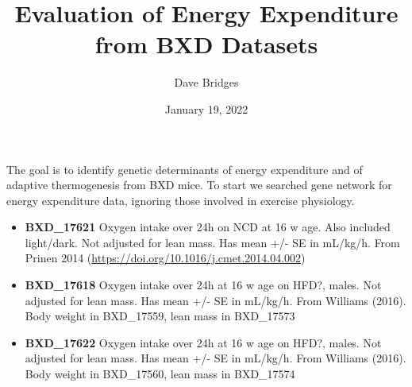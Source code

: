 \documentclass[]{article}
\title{Evaluation of Energy Expenditure from BXD Datasets}
\author{Dave Bridges}
\date{January 19, 2022}
\providecommand{\tightlist}{%
  \setlength{\itemsep}{0pt}\setlength{\parskip}{0pt}}
\begin{document}
\maketitle

{
\setcounter{tocdepth}{2}
\tableofcontents
}
The goal is to identify genetic determinants of energy expenditure and
of adaptive thermogenesis from BXD mice. To start we searched gene
network for energy expenditure data, ignoring those involved in exercise
physiology.

\begin{itemize}
\tightlist
\item
  \textbf{BXD\_17621} Oxygen intake over 24h on NCD at 16 w age. Also
  included light/dark. Not adjusted for lean mass. Has mean +/- SE in
  mL/kg/h. From Prinen 2014
  (\url{https://doi.org/10.1016/j.cmet.2014.04.002})
\item
  \textbf{BXD\_17618} Oxygen intake over 24h at 16 w age on HFD?, males.
  Not adjusted for lean mass. Has mean +/- SE in mL/kg/h. From Williams
  (2016). Body weight in BXD\_17559, lean mass in BXD\_17573
\item
  \textbf{BXD\_17622} Oxygen intake over 24h at 16 w age on HFD?, males.
  Not adjusted for lean mass. Has mean +/- SE in mL/kg/h. From Williams
  (2016). Body weight in BXD\_17560, lean mass in BXD\_17574
\end{itemize}
\end{document}
